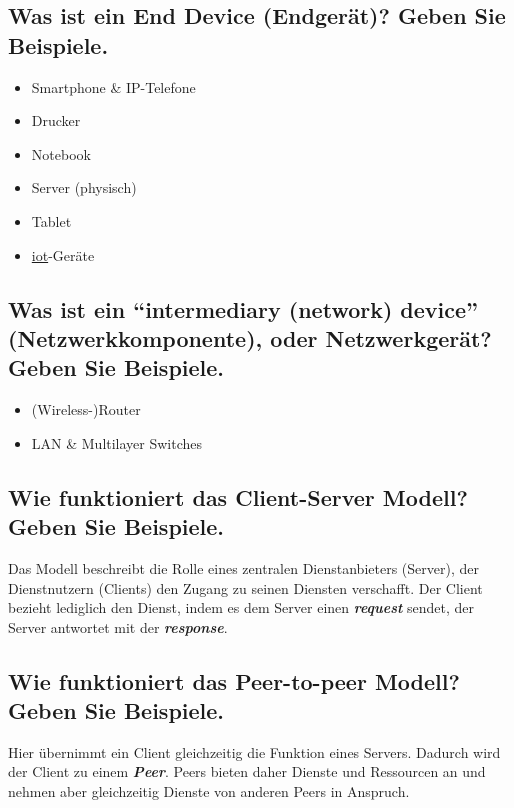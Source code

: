 \pagebreak

\subsection*{Was ist ein \flqq End Device\frqq{} (Endgerät)? Geben Sie Beispiele.}
\begin{itemize}
    \item Smartphone \& IP-Telefone
    \item Drucker
    \item Notebook
    \item Server (physisch)
    \item Tablet
    \item \underline{\acrshort{iot}}-Geräte
\end{itemize}

\subsection*{Was ist ein ``intermediary (network) device'' (Netzwerkkomponente), oder Netzwerkgerät? Geben Sie Beispiele.}
\begin{itemize}
    \item (Wireless-)Router
    \item LAN \& Multilayer Switches
\end{itemize}

\subsection*{Wie funktioniert das \flqq Client-Server\frqq{} Modell? Geben Sie Beispiele.}
Das Modell beschreibt die Rolle eines zentralen Dienstanbieters (Server), der Dienstnutzern (Clients) den Zugang zu seinen Diensten verschafft. Der Client bezieht lediglich den Dienst, indem es dem Server einen \textsl{\textbf{request}} sendet, der Server antwortet mit der \textsl{\textbf{response}}.

\subsection*{Wie funktioniert das \flqq Peer-to-peer\frqq{} Modell? Geben Sie Beispiele.}
Hier übernimmt ein Client gleichzeitig die Funktion eines Servers. Dadurch wird der Client zu einem \textsl{\textbf{Peer}}. Peers bieten daher Dienste und Ressourcen an und nehmen aber gleichzeitig Dienste von anderen Peers in Anspruch.

